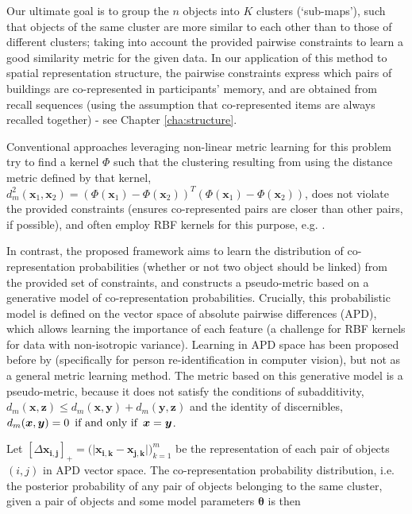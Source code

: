 Our ultimate goal is to group the $n$ objects into $K$ clusters (`sub-maps'), such that objects of the same cluster are more similar to each other than to those of different clusters; taking into account the provided pairwise constraints to learn a good similarity metric for the given data. In our application of this method to spatial representation structure, the pairwise constraints express which pairs of buildings are co-represented in participants' memory, and are obtained from recall sequences (using the assumption that co-represented items are always recalled together) - see Chapter \ref{cha:structure}.

Conventional approaches leveraging non-linear metric learning for this problem try to find a kernel $\Phi$ such that the clustering resulting from using the distance metric defined by that kernel, $d_m^2(\bm x_1, \bm x_2)=(\Phi(\bm x_1)-\Phi(\bm x_2))^T(\Phi(\bm x_1)-\Phi(\bm x_2))$, does not violate the provided constraints (ensures co-represented pairs are closer than other pairs, if possible), and often employ RBF kernels for this purpose, e.g. \citep{baghshah2010kernel, chitta2011approximate}. 

In contrast, the proposed framework aims to learn the distribution of co-representation probabilities (whether or not two object should be linked) from the provided set of constraints, and constructs a pseudo-metric based on a generative model of co-representation probabilities. Crucially, this probabilistic model is defined on the vector space of absolute pairwise differences (APD), which allows learning the importance of each feature (a challenge for RBF kernels for data with non-isotropic variance). Learning in APD space has been proposed before by \cite{zheng2011person} (specifically for person re-identification in computer vision), but not as a general metric learning method. The metric based on this generative model is a pseudo-metric, because it does not satisfy the conditions of subadditivity, $d_m(\bm x, \bm z) \leq d_m(\bm x, \bm y)+d_m(\bm y,\bm z)$ and the identity of discernibles, $d_m(\bm x, \bm y) = 0 \enskip \text{if and only if} \enskip \bm x = \bm y$.

Let $[\Delta \bm{x_{i,j}}]_+ = \big( \lvert \bm{x_{i,k}} - \bm{x_{j,k}} \lvert \big)_{k=1}^m $ be the representation of each pair of objects $(i,j)$ in APD vector space. The co-representation probability distribution, i.e. the posterior probability of any pair of objects belonging to the same cluster, given a pair of objects and some model parameters $\bm{\theta}$ is then 

